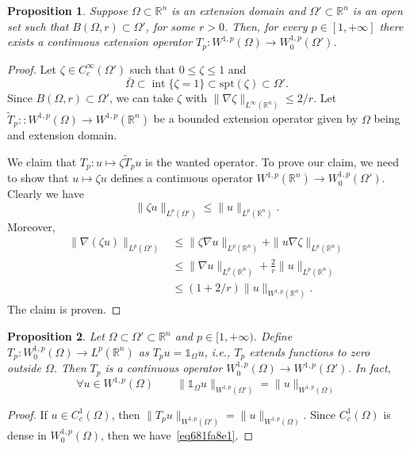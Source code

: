 \documentclass[a4paper,9pt]{amsart}
\newcommand{\R}{\mathbb{R}}	%
\newcommand{\spt}{\mathrm{spt}}
\newcommand{\grad}{\nabla}
\newcommand{\interior}{\operatorname{int}}
\newcommand{\one}{{\mathds 1\!}}
\theoremstyle{plain}
\newtheorem{proposition}{Proposition}[section]
\theoremstyle{definition}
\theoremstyle{remark}
\begin{document}
\begin{proposition}\label{prop681fa9b9}
	Suppose $\Omega\subset\R^n$ is an extension domain and $\Omega'\subset\R^n$ is an open set such that $B(\Omega,r)\subset \Omega'$, for some $r>0$.
	Then, for every $p\in[1,+\infty]$ there exists a continuous extension operator $T_p:W^{1,p}(\Omega)\to W^{1,p}_0(\Omega')$.
\end{proposition}
\begin{proof}
	Let $\zeta\in C^\infty_c(\Omega')$ such that $0\le\zeta\le 1$ and 
	\begin{equation}
		\bar\Omega \subset\interior\{\zeta=1\} \subset\spt(\zeta)\subset\Omega' .
	\end{equation}
	Since $B(\Omega,r)\subset \Omega'$, we can take $\zeta$ with $\|\grad\zeta\|_{L^\infty(\R^n)} \le 2/r$.
	Let $\tilde T_p::W^{1,p}(\Omega) \to W^{1,p}(\R^n)$ be a bounded extension operator given by $\Omega$ being and extension domain.
	
	We claim that $T_p:u\mapsto \zeta \tilde T_pu$ is the wanted operator.
	To prove our claim, we need to show that $u\mapsto \zeta u$ defines a continuous operator $W^{1,p}(\R^n)\to W^{1,p}_0(\Omega')$.
	Clearly we have
	\begin{equation}
		\|\zeta u\|_{L^p(\Omega')} \le \|u\|_{L^p(\R^n)} .
	\end{equation}
	Moreover,
	\begin{align}
		\|\grad(\zeta u)\|_{L^p(\Omega')}
		&\le \|\zeta\grad u\|_{L^p(\R^n)} + \|u\grad\zeta\|_{L^p(\R^n)} \\
		&\le \|\grad u\|_{L^p(\R^n)} + \frac2r \|u\|_{L^p(\R^n)} \\
		&\le (1+2/r) \|u\|_{W^{1,p}(\R^n)} .
	\end{align}
	The claim is proven.
\end{proof}

\begin{proposition}\label{prop681fa951}
	Let $\Omega\subset\Omega'\subset\R^n$ and $p\in[1,+\infty)$.
	Define $T_p:W^{1,p}_0(\Omega)\to L^p(\R^n)$ as
	$T_pu = \one_\Omega u$, i.e., $T_p$ extends functions to zero outside $\Omega$.
	Then $T_p$ is a continuous operator $W^{1,p}_0(\Omega)\to W^{1,p}(\Omega')$.
	In fact,
	\begin{equation}\label{eq681fa8e1}
		\forall u\in W^{1,p}(\Omega)\qquad
		\|\one_\Omega u\|_{W^{1,p}(\Omega')} = \|u\|_{W^{1,p}(\Omega)}
	\end{equation}
\end{proposition}
\begin{proof}
	If $u\in C^1_c(\Omega)$, then $\|T_pu\|_{W^{1,p}(\Omega')} = \|u\|_{W^{1,p}(\Omega)}$.
	Since $C^1_c(\Omega)$ is dense in $W^{1,p}_0(\Omega)$, then we have~\eqref{eq681fa8e1}.
\end{proof}
\end{document}
